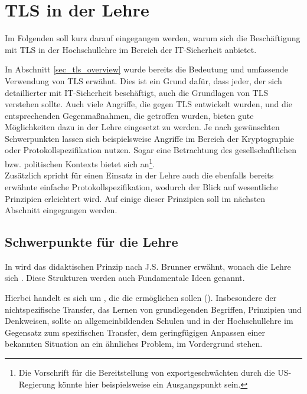 \chapter{TLS in der Lehre}
\label{cha_tls_teaching}

Im Folgenden soll kurz darauf eingegangen werden, warum sich die Beschäftigung mit TLS in der Hochschullehre im Bereich der IT-Sicherheit anbietet. %

In Abschnitt \ref{sec_tls_overview} wurde bereits die Bedeutung und umfassende Verwendung von TLS erwähnt. Dies ist ein Grund dafür, dass jeder, der sich detaillierter mit IT-Sicherheit beschäftigt, auch die Grundlagen von TLS verstehen sollte. Auch viele Angriffe, die gegen TLS entwickelt wurden, und die entsprechenden Gegenmaßnahmen, die getroffen wurden, bieten gute Möglichkeiten dazu in der Lehre eingesetzt zu werden. Je nach gewünschten Schwerpunkten lassen sich beispielsweise Angriffe im Bereich der Kryptographie oder Protokollspezifikation nutzen. Sogar eine Betrachtung des gesellschaftlichen bzw. politischen Kontexts bietet sich an\footnote{Die Vorschrift für die Bereitstellung von exportgeschwächten \ciphersuites{} durch die US-Regierung könnte hier beispielsweise ein Ausgangspunkt sein.}.\\
Zusätzlich spricht für einen Einsatz in der Lehre auch die ebenfalls bereits erwähnte einfache Protokollspezifikation, wodurch der Blick auf wesentliche Prinzipien erleichtert wird. Auf einige dieser Prinzipien soll im nächsten Abschnitt eingegangen werden.

\section{Schwerpunkte für die Lehre}

In \cite{schubert11} wird das didaktischen Prinzip nach J.S. Brunner erwähnt, wonach die Lehre sich . Diese Strukturen werden auch Fundamentale Ideen genannt.

Hierbei handelt es sich um , die die  ermöglichen sollen (\cite{schubert11}). Insbesondere der nichtspezifische Transfer, das Lernen von grundlegenden Begriffen, Prinzipien und Denkweisen, sollte an allgemeinbildenden Schulen und in der Hochschullehre im Gegensatz zum spezifischen Transfer, dem geringfügigen Anpassen einer bekannten Situation an ein ähnliches Problem, im Vordergrund stehen.

